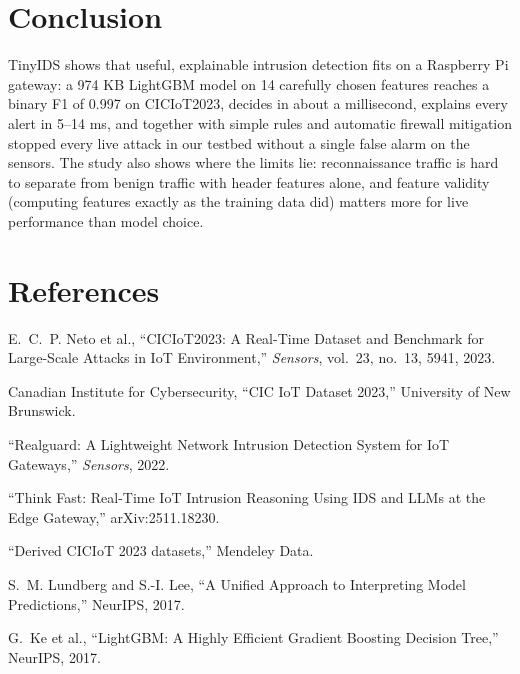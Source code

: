 \documentclass[11pt,a4paper]{article}
\begin{document}
\section{Conclusion}

TinyIDS shows that useful, explainable intrusion detection fits on a Raspberry Pi gateway: a 974 KB LightGBM model
on 14 carefully chosen features reaches a binary F1 of 0.997 on CICIoT2023, decides in about a millisecond,
explains every alert in 5--14 ms, and together with simple rules and automatic firewall mitigation stopped every
live attack in our testbed without a single false alarm on the sensors. The study also shows where the limits lie:
reconnaissance traffic is hard to separate from benign traffic with header features alone, and feature validity
(computing features exactly as the training data did) matters more for live performance than model choice.

\section*{References}
\small
\begin{enumerate}[label={[\arabic*]}]
  \item E.~C.~P. Neto et al., ``CICIoT2023: A Real-Time Dataset and Benchmark for Large-Scale Attacks in IoT
        Environment,'' \emph{Sensors}, vol.~23, no.~13, 5941, 2023.
  \item Canadian Institute for Cybersecurity, ``CIC IoT Dataset 2023,'' University of New Brunswick.
  \item ``Realguard: A Lightweight Network Intrusion Detection System for IoT Gateways,'' \emph{Sensors}, 2022.
  \item ``Think Fast: Real-Time IoT Intrusion Reasoning Using IDS and LLMs at the Edge Gateway,'' arXiv:2511.18230.
  \item ``Derived CICIoT 2023 datasets,'' Mendeley Data.
  \item S.~M. Lundberg and S.-I. Lee, ``A Unified Approach to Interpreting Model Predictions,'' NeurIPS, 2017.
  \item G.~Ke et al., ``LightGBM: A Highly Efficient Gradient Boosting Decision Tree,'' NeurIPS, 2017.
\end{enumerate}
\end{document}

